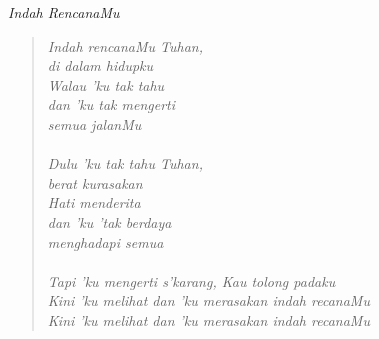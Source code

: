 \small
\begin{center}
	\itshape{Indah RencanaMu}
\end{center}
\begin{verse}
	\itshape{
Indah rencanaMu Tuhan,\\ 
di dalam hidupku\\
Walau 'ku tak tahu\\ 
dan 'ku tak mengerti\\ 
semua jalanMu\\
{~}\\
Dulu 'ku tak tahu Tuhan,\\ 
berat kurasakan\\
Hati menderita\\ 
dan 'ku 'tak berdaya\\ 
menghadapi semua\\
{~}\\
Tapi 'ku mengerti s'karang, Kau tolong padaku\\
Kini 'ku melihat dan 'ku merasakan indah recanaMu\\
Kini 'ku melihat dan 'ku merasakan indah recanaMu\\
}
\end{verse}
\normalsize
